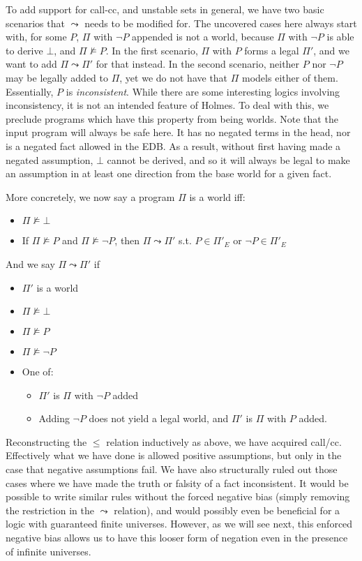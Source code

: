 To add support for call-cc, and unstable sets in general, we have two basic scenarios that $\leadsto$ needs to be modified for.
The uncovered cases here always start with, for some $P$, $\Pi$ with $\neg P$ appended is not a world, because $\Pi$ with $\neg P$ is able to derive $\bot$, and $\Pi \not \models P$.
In the first scenario, $\Pi$ with $P$ forms a legal $\Pi'$, and we want to add $\Pi \leadsto \Pi'$ for that instead.
In the second scenario, neither $P$ nor $\neg P$ may be legally added to $\Pi$, yet we do not have that $\Pi$ models either of them.
Essentially, $P$ is \emph{inconsistent}.
While there are some interesting logics involving inconsistency, it is not an intended feature of Holmes.
To deal with this, we preclude programs which have this property from being worlds.
Note that the input program will always be safe here.
It has no negated terms in the head, nor is a negated fact allowed in the EDB.
As a result, without first having made a negated assumption, $\bot$ cannot be derived, and so it will always be legal to make an assumption in at least one direction from the base world for a given fact.

More concretely, we now say a program $\Pi$ is a world iff:
\begin{itemize}
	\item $\Pi \not \models \bot$
	\item If $\Pi \not \models P$ and $\Pi \not \models \neg P$, then $\Pi \leadsto \Pi'$ s.t. $P \in \Pi'_E$ or $\neg P \in \Pi'_E$
\end{itemize}

And we say $\Pi \leadsto \Pi'$ if
\begin{itemize}
	\item $\Pi'$ is a world
	\item $\Pi \not \models \bot$
	\item $\Pi \not \models P$
	\item $\Pi \not \models \neg P$
	\item One of:
	\begin{itemize}
		\item $\Pi'$ is $\Pi$ with $\neg P$ added
		\item Adding $\neg P$ does not yield a legal world, and $\Pi'$ is $\Pi$ with $P$ added.
	\end{itemize}
\end{itemize}

Reconstructing the $\leq$ relation inductively as above, we have acquired call/cc.
Effectively what we have done is allowed positive assumptions, but only in the case that negative assumptions fail.
We have also structurally ruled out those cases where we have made the truth or falsity of a fact inconsistent.
It would be possible to write similar rules without the forced negative bias (simply removing the restriction in the $\leadsto$ relation), and would possibly even be beneficial for a logic with guaranteed finite universes.
However, as we will see next, this enforced negative bias allows us to have this looser form of negation even in the presence of infinite universes.

